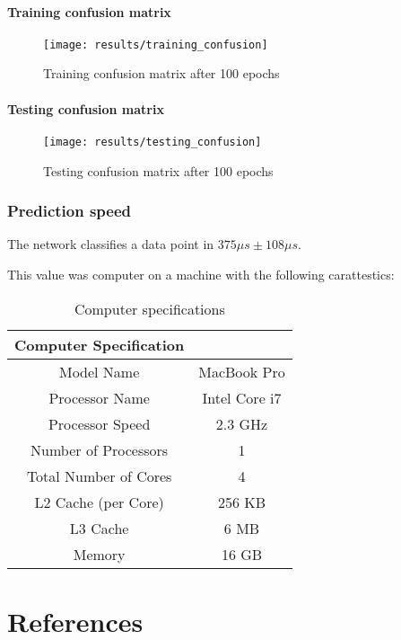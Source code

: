 \subsection{Training confusion matrix}
\begin{figure}
	\texttt{[image: results/training\_confusion]}
	\caption{Training confusion matrix after 100 epochs}
\end{figure}

\subsection{Testing confusion matrix}
\begin{figure}
	\texttt{[image: results/testing\_confusion]}
	\caption{Testing confusion matrix after 100 epochs}
\end{figure}

\section{Prediction speed}
The network classifies a data point in \(375 \mu s \pm 108 \mu s\).

This value was computer on a machine with the following carattestics:

\begin{table}
	\begin{tabular}{|c|c|}
		\hline
		\textbf{Computer Specification}       \\
		\hline
		Model Name            & MacBook Pro   \\
		\hline
		Processor Name        & Intel Core i7 \\
		\hline
		Processor Speed       & 2.3 GHz       \\
		\hline
		Number of Processors  & 1             \\
		\hline
		Total Number of Cores & 4             \\
		\hline
		L2 Cache (per Core)   & 256 KB        \\
		\hline
		L3 Cache              & 6 MB          \\
		\hline
		Memory                & 16 GB         \\
		\hline
	\end{tabular}
	\caption{Computer specifications}
\end{table}

\part{References}

